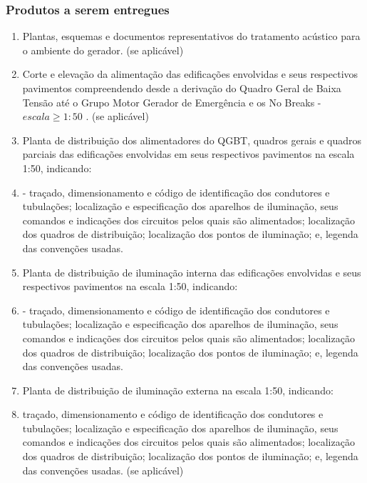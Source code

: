 \subsubsection{Produtos a serem entregues}
	\begin{enumerate}
	

	\item Plantas, esquemas e documentos representativos do tratamento acústico para o ambiente do gerador. (se aplicável)

	\item Corte e elevação da alimentação das edificações envolvidas e seus respectivos pavimentos compreendendo desde a derivação do Quadro Geral de Baixa Tensão até o Grupo Motor Gerador de Emergência e os No Breaks - $escala \geq 1:50$ . (se aplicável)

	\item Planta de distribuição dos alimentadores do QGBT, quadros gerais e quadros parciais das edificações envolvidas em seus  respectivos pavimentos na escala 1:50, indicando: 

	\item - traçado, dimensionamento e código de identificação dos condutores e tubulações; localização e especificação dos aparelhos de iluminação, seus comandos e indicações dos circuitos pelos quais são alimentados; localização dos quadros de distribuição; localização dos pontos de iluminação; e, legenda das convenções usadas.

	\item Planta de distribuição de iluminação interna das edificações envolvidas e seus  respectivos pavimentos na escala 1:50, indicando: 

	\item - traçado, dimensionamento e código de identificação dos condutores e tubulações; localização e especificação dos aparelhos de iluminação, seus comandos e indicações dos circuitos pelos quais são alimentados; localização dos quadros de distribuição; localização dos pontos de iluminação; e, legenda das convenções usadas.

	\item Planta de distribuição de iluminação externa na escala 1:50,  indicando: 

	\item traçado, dimensionamento e código de identificação dos condutores e tubulações; localização e especificação dos aparelhos de iluminação, seus comandos e indicações dos circuitos pelos quais são alimentados; localização dos quadros de distribuição; localização dos pontos de iluminação; e, legenda das convenções usadas. (se aplicável)


\end{enumerate}
